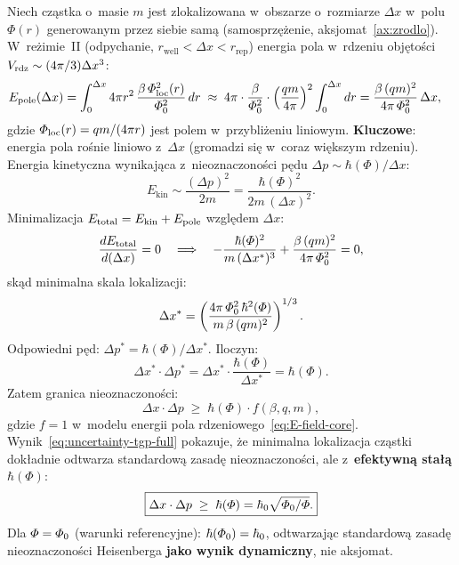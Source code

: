\begin{proposition}\label{prop:uncertainty-tgp}
Niech cz\k{a}stka o~masie $m$ jest zlokalizowana w~obszarze
o~rozmiarze $\Delta x$ w~polu $\Phi(r)$ generowanym przez
siebie sam\k{a} (samosprzężenie, aksjomat~\ref{ax:zrodlo}).
W~re\.zimie~II (odpychanie, $r_{\mathrm{well}} < \Delta x < r_{\mathrm{rep}}$)
energia pola w~rdzeniu obj\k{e}to\'sci $V_{\rm rdz} \sim (4\pi/3)\Delta x^3$:
\begin{align}\label{eq:E-field-core}
  E_{\rm pole}(\Delta x)
  &= \int_0^{\Delta x} 4\pi r^2\,
     \frac{\beta\,\Phi_{\rm loc}^2(r)}{\PhiZero^2}\,dr
  \;\approx\;
  4\pi \cdot \frac{\beta}{\PhiZero^2}
  \cdot \left(\frac{qm}{4\pi}\right)^2
  \int_0^{\Delta x} dr
  = \frac{\beta\,(qm)^2}{4\pi\,\PhiZero^2}\,\Delta x,
\end{align}
gdzie $\Phi_{\rm loc}(r) = qm/(4\pi r)$ jest polem w~przybli\.zeniu liniowym.
\textbf{Kluczowe}: energia pola ro\'snie liniowo z~$\Delta x$
(gromadzi si\k{e} w~coraz wi\k{e}kszym rdzeniu).
Energia kinetyczna wynikaj\k{a}ca z~nieoznaczono\'sci p\k{e}du
$\Delta p \sim \hbar(\Phi)/\Delta x$:
\begin{equation}\label{eq:E-kin-uncertainty}
  E_{\mathrm{kin}} \sim \frac{(\Delta p)^2}{2m}
  = \frac{\hbar(\Phi)^2}{2m\,(\Delta x)^2}.
\end{equation}
Minimalizacja $E_{\mathrm{total}} = E_{\mathrm{kin}} + E_{\rm pole}$
wzgl\k{e}dem $\Delta x$:
\begin{equation}\label{eq:Emin-condition}
  \frac{dE_{\rm total}}{d(\Delta x)} = 0
  \quad\Longrightarrow\quad
  -\frac{\hbar(\Phi)^2}{m\,(\Delta x^*)^3} + \frac{\beta\,(qm)^2}{4\pi\,\PhiZero^2} = 0,
\end{equation}
skąd minimalna skala lokalizacji:
\begin{equation}\label{eq:Dx-min}
  \Delta x^* = \left(\frac{4\pi\,\PhiZero^2\,\hbar^2(\Phi)}{m\,\beta\,(qm)^2}\right)^{1/3}.
\end{equation}
Odpowiedni p\k{e}d: $\Delta p^* = \hbar(\Phi)/\Delta x^*$. Iloczyn:
\begin{equation}\label{eq:uncertainty-tgp-full}
  \Delta x^*\cdot\Delta p^*
  = \Delta x^* \cdot \frac{\hbar(\Phi)}{\Delta x^*} = \hbar(\Phi).
\end{equation}
Zatem granica nieoznaczono\'sci:
\begin{equation}\label{eq:uncertainty-tgp}
  \Delta x \cdot \Delta p
  \;\geq\;
  \hbar(\Phi)\cdot f(\beta, q, m),
\end{equation}
gdzie \textbf{$f = 1$} w~modelu energii pola rdzeniowego~\eqref{eq:E-field-core}.
Wynik~\eqref{eq:uncertainty-tgp-full} pokazuje, \.ze minimalna
lokalizacja cz\k{a}stki dok\l{}adnie odtwarza standardow\k{a}
zasad\k{e} nieoznaczono\'sci, ale z~\textbf{efektywn\k{a}
sta\l{}\k{a} $\hbar(\Phi)$}:
\begin{equation}\label{eq:HUP-TGP}
  \boxed{\Delta x \cdot \Delta p \;\geq\; \hbar(\Phi) = \hbar_0\sqrt{\PhiZero/\Phi}.}
\end{equation}
Dla $\Phi = \PhiZero$ (warunki referencyjne): $\hbar(\PhiZero) = \hbar_0$,
odtwarzając standardow\k{a} zasad\k{e} nieoznaczono\'sci Heisenberga
\textbf{jako wynik dynamiczny}, nie aksjomat.


\end{proposition}
